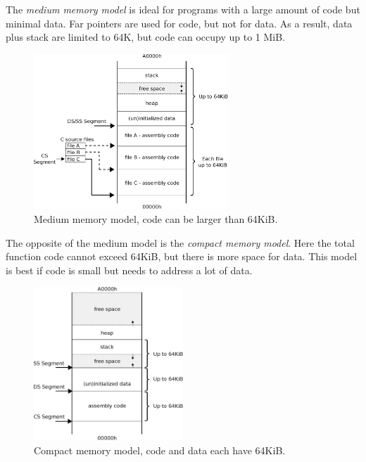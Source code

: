 \documentclass[book.tex]{subfiles}
\begin{document}
\par
The \textit{medium memory model} is ideal for programs with a large amount of code but minimal data. Far pointers are used for code, but not for data. As a result, data
plus stack are limited to 64K, but code can occupy up to 1 MiB. \\
\begin{figure}[H]
\centering
\includegraphics[width=0.65\textwidth]{imgs/drawings/memory/medium_mm.eps}
\caption{Medium memory model, code can be larger than 64KiB.}
\label{fig:mm_medium}
\end{figure}

\par
The opposite of the medium model is the \textit{compact memory model}. Here the total function code cannot exceed 64KiB, but there is more space for data. This model is best if code is small but needs to address a lot of data.\\
\begin{figure}[H]
\centering
\includegraphics[width=0.5\textwidth]{imgs/drawings/memory/compact_mm.eps}
\caption{Compact memory model, code and data each have 64KiB.}
\label{fig:mm_compact}
\end{figure}
\end{document}
